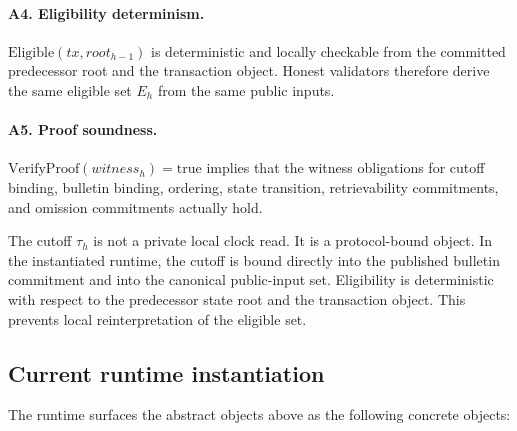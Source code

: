 \documentclass[11pt]{article}
\begin{document}
\paragraph{A4. Eligibility determinism.}
\(\mathrm{Eligible}(tx, root_{h-1})\) is deterministic and locally checkable
from the committed predecessor root and the transaction object. Honest
validators therefore derive the same eligible set \(E_h\) from the same public
inputs.

\paragraph{A5. Proof soundness.}
\(\mathrm{VerifyProof}(witness_h) = \mathrm{true}\) implies that the witness
obligations for cutoff binding, bulletin binding, ordering, state transition,
retrievability commitments, and omission commitments actually hold.

The cutoff \(\tau_h\) is not a private local clock read. It is a protocol-bound
object. In the instantiated runtime, the cutoff is bound directly into
the published bulletin commitment and into the canonical public-input set.
Eligibility is deterministic with respect to the predecessor state root and the
transaction object. This prevents local reinterpretation of the eligible set.

\subsection{Current runtime instantiation}

The runtime surfaces the abstract objects above as the following concrete
objects:
\end{document}
